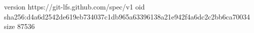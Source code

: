 version https://git-lfs.github.com/spec/v1
oid sha256:d4a6d2542de619eb734037c1db965a63396138a21e942f4a6dc2c2bb6ca70034
size 87536
